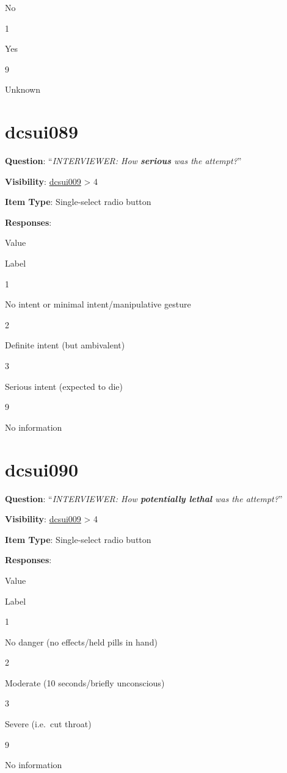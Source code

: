 \documentclass[]{book}
\begin{document}
No

1

Yes

9

Unknown

\hypertarget{dcsui089}{%
\section{dcsui089}\label{dcsui089}}

\textbf{Question}: ``\emph{INTERVIEWER: How \textbf{serious} was the attempt?}''

\textbf{Visibility}: \protect\hyperlink{dcsui009}{dcsui009} \textgreater{} 4

\textbf{Item Type}: Single-select radio button

\textbf{Responses}:

Value

Label

1

No intent or minimal intent/manipulative gesture

2

Definite intent (but ambivalent)

3

Serious intent (expected to die)

9

No information

\hypertarget{dcsui090}{%
\section{dcsui090}\label{dcsui090}}

\textbf{Question}: ``\emph{INTERVIEWER: How \textbf{potentially lethal} was the attempt?}''

\textbf{Visibility}: \protect\hyperlink{dcsui009}{dcsui009} \textgreater{} 4

\textbf{Item Type}: Single-select radio button

\textbf{Responses}:

Value

Label

1

No danger (no effects/held pills in hand)

2

Moderate (10 seconds/briefly unconscious)

3

Severe (i.e.~cut throat)

9

No information
\end{document}
